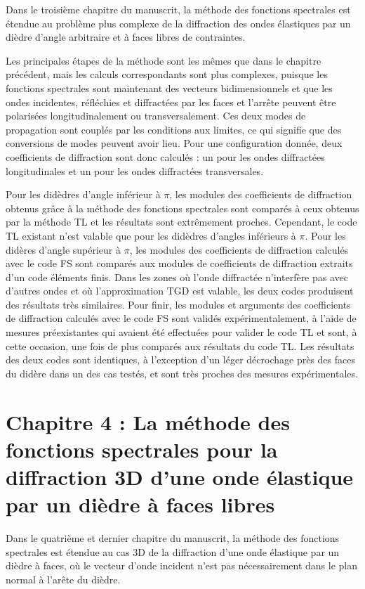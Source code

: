 Dans le troisième chapitre du manuscrit, la méthode des fonctions spectrales est étendue au problème plus complexe de la diffraction des ondes élastiques par un dièdre d'angle arbitraire et à faces libres de contraintes.

Les principales étapes de la méthode sont les mêmes que dans le chapitre précédent, mais les calculs correspondants sont plus complexes, puisque les fonctions spectrales sont maintenant des vecteurs bidimensionnels et que les ondes incidentes, réfléchies et diffractées par les faces et l'arrête peuvent être polarisées longitudinalement ou transversalement. Ces deux modes de propagation sont couplés par les conditions aux limites, ce qui signifie que des conversions de modes peuvent avoir lieu. Pour une configuration donnée, deux coefficients de diffraction sont donc calculés : un pour les ondes diffractées longitudinales et un pour les ondes diffractées transversales. 

Pour les didèdres d'angle inférieur à $\pi$, les modules des coefficients de diffraction obtenus grâce à la méthode des fonctions spectrales sont comparés à ceux obtenus par la méthode TL et les résultats sont extrêmement proches. Cependant, le code TL existant n'est valable que pour les didèdres d'angles inférieurs à $\pi$. Pour les didères d'angle supérieur à $\pi$, les modules des coefficients de diffraction calculés avec le code FS sont comparés aux modules de coefficients de diffraction extraits d'un code éléments finis. Dans les zones où l'onde diffractée n'interfère pas avec d'autres ondes et où l'approximation TGD est valable, les deux codes produisent des résultats très similaires. Pour finir, les modules et arguments des coefficients de diffraction calculés avec le code FS sont validés expérimentalement, à l'aide de mesures préexistantes qui avaient été effectuées pour valider le code TL et sont, à cette occasion, une fois de plus comparés aux résultats du code TL. Les résultats des deux codes sont identiques, à l'exception d'un léger décrochage près des faces du didère dans un des cas testés, et sont très proches des mesures expérimentales.

\section[Résumé du chapitre 4]{Chapitre 4 : La méthode des fonctions spectrales pour la diffraction 3D d'une onde élastique par un dièdre à faces libres}

Dans le quatrième et dernier chapitre du manuscrit, la méthode des fonctions spectrales est étendue au cas 3D de la diffraction d'une onde élastique par un dièdre à faces, où le vecteur d'onde incident n'est pas nécessairement dans le plan normal à l'arête du dièdre. 

